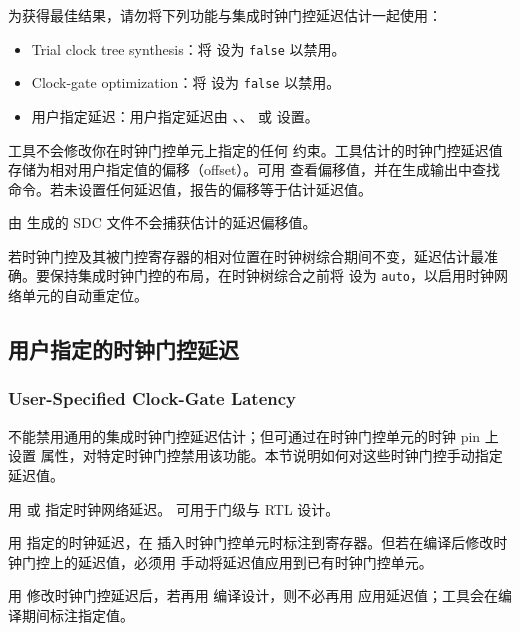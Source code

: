 为获得最佳结果，请勿将下列功能与集成时钟门控延迟估计一起使用：
\begin{itemize}
  \item Trial clock tree synthesis：将  设为 \texttt{false} 以禁用。
  \item Clock-gate optimization：将  设为 \texttt{false} 以禁用。
  \item 用户指定延迟：用户指定延迟由 、、 或  设置。
\end{itemize}

工具不会修改你在时钟门控单元上指定的任何  约束。工具估计的时钟门控延迟值存储为相对用户指定值的偏移（offset）。可用  查看偏移值，并在生成输出中查找  命令。若未设置任何延迟值，报告的偏移等于估计延迟值。

由  生成的 SDC 文件不会捕获估计的延迟偏移值。

若时钟门控及其被门控寄存器的相对位置在时钟树综合期间不变，延迟估计最准确。要保持集成时钟门控的布局，在时钟树综合之前将  设为 \texttt{auto}，以启用时钟网络单元的自动重定位。

\subsection{用户指定的时钟门控延迟}
\subsubsection*{User-Specified Clock-Gate Latency}

不能禁用通用的集成时钟门控延迟估计；但可通过在时钟门控单元的时钟 pin 上设置  属性，对特定时钟门控禁用该功能。本节说明如何对这些时钟门控手动指定延迟值。

用  或  指定时钟网络延迟。 可用于门级与 RTL 设计。

用  指定的时钟延迟，在  插入时钟门控单元时标注到寄存器。但若在编译后修改时钟门控上的延迟值，必须用  手动将延迟值应用到已有时钟门控单元。

\begin{noteBox}
用  修改时钟门控延迟后，若再用  编译设计，则不必再用  应用延迟值；工具会在编译期间标注指定值。
\end{noteBox}

